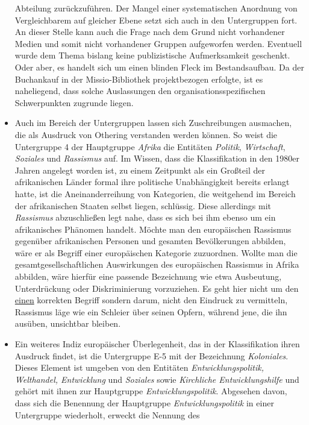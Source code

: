 \documentclass[a4paper,
fontsize=11pt,
oneside,
numbers=noperiodatend,
parskip=half-,
bibliography=totoc,
final
]{scrartcl}
\begin{document}
\begin{itemize}
  Abteilung zurückzuführen. Der Mangel einer systematischen Anordnung
  von Vergleichbarem auf gleicher Ebene setzt sich auch in den
  Untergruppen fort. An dieser Stelle kann auch die Frage nach dem Grund
  nicht vorhandener Medien und somit nicht vorhandener Gruppen
  aufgeworfen werden. Eventuell wurde dem Thema bislang keine
  publizistische Aufmerksamkeit geschenkt. Oder aber, es handelt sich um
  einen blinden Fleck im Bestandsaufbau. Da der Buchankauf in der
  Missio-Bibliothek projektbezogen erfolgte, ist es naheliegend, dass
  solche Auslassungen den organisationsspezifischen Schwerpunkten
  zugrunde liegen.
\item
  Auch im Bereich der Untergruppen lassen sich Zuschreibungen ausmachen,
  die als Ausdruck von Othering verstanden werden können. So weist die
  Untergruppe 4 der Hauptgruppe \emph{Afrika} die Entitäten
  \emph{Politik}, \emph{Wirtschaft}, \emph{Soziales} und
  \emph{Rassismus} auf. Im Wissen, dass die Klassifikation in den 1980er
  Jahren angelegt worden ist, zu einem Zeitpunkt als ein Großteil der
  afrikanischen Länder formal ihre politische Unabhängigkeit bereits
  erlangt hatte, ist die Aneinanderreihung von Kategorien, die
  weitgehend im Bereich der afrikanischen Staaten selbst liegen,
  schlüssig. Diese allerdings mit \emph{Rassismus} abzuschließen legt
  nahe, dass es sich bei ihm ebenso um ein afrikanisches Phänomen
  handelt. Möchte man den europäischen Rassismus gegenüber afrikanischen
  Personen und gesamten Bevölkerungen abbilden, wäre er als Begriff
  einer europäischen Kategorie zuzuordnen. Wollte man die
  gesamtgesellschaftlichen Auswirkungen des europäischen Rassismus in
  Afrika abbilden, wäre hierfür eine passende Bezeichnung wie etwa
  Ausbeutung, Unterdrückung oder Diskriminierung vorzuziehen. Es geht
  hier nicht um den \uline{einen} korrekten Begriff sondern darum, nicht
  den Eindruck zu vermitteln, Rassismus läge wie ein Schleier über
  seinen Opfern, während jene, die ihn ausüben, unsichtbar bleiben.
\item
  Ein weiteres Indiz europäischer Überlegenheit, das in der
  Klassifikation ihren Ausdruck findet, ist die Untergruppe E-5 mit der
  Bezeichnung \emph{Koloniales}. Dieses Element ist umgeben von den
  Entitäten \emph{Entwicklungspolitik, Welthandel, Entwicklung} und
  \emph{Soziales} sowie \emph{Kirchliche Entwicklungshilfe} und gehört
  mit ihnen zur Hauptgruppe \emph{Entwicklungspolitik}. Abgesehen davon,
  dass sich die Benennung der Hauptgruppe \emph{Entwicklungspolitik} in
  einer Untergruppe wiederholt, erweckt die Nennung des

\end{itemize}
\end{document}
